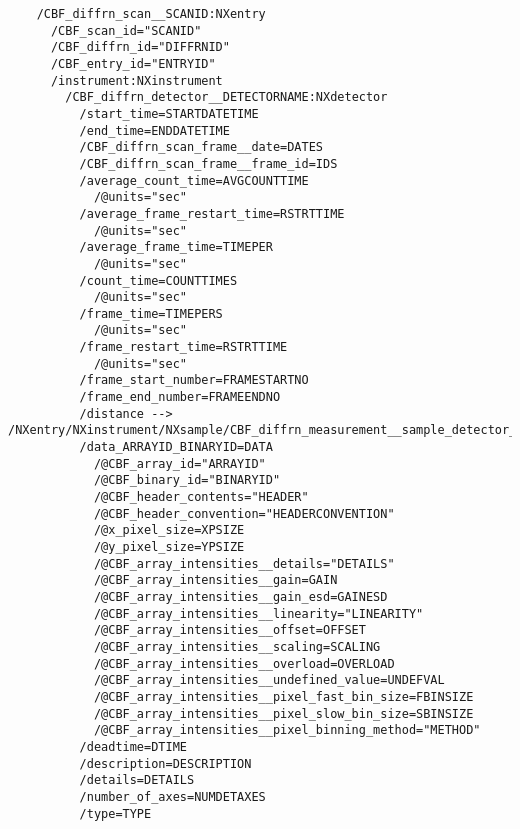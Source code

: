 \documentclass[11pt]{article}
\begin{document}
\footnotesize{\begin{verbatim}
    /CBF_diffrn_scan__SCANID:NXentry
      /CBF_scan_id="SCANID"
      /CBF_diffrn_id="DIFFRNID"
      /CBF_entry_id="ENTRYID"
      /instrument:NXinstrument
        /CBF_diffrn_detector__DETECTORNAME:NXdetector
          /start_time=STARTDATETIME
          /end_time=ENDDATETIME
          /CBF_diffrn_scan_frame__date=DATES
          /CBF_diffrn_scan_frame__frame_id=IDS
          /average_count_time=AVGCOUNTTIME
            /@units="sec"
          /average_frame_restart_time=RSTRTTIME
            /@units="sec" 
          /average_frame_time=TIMEPER
            /@units="sec" 
          /count_time=COUNTTIMES
            /@units="sec"
          /frame_time=TIMEPERS
            /@units="sec" 
          /frame_restart_time=RSTRTTIME
            /@units="sec" 
          /frame_start_number=FRAMESTARTNO
          /frame_end_number=FRAMEENDNO
          /distance --> /NXentry/NXinstrument/NXsample/CBF_diffrn_measurement__sample_detector_distance
          /data_ARRAYID_BINARYID=DATA
            /@CBF_array_id="ARRAYID"
            /@CBF_binary_id="BINARYID"
            /@CBF_header_contents="HEADER"
            /@CBF_header_convention="HEADERCONVENTION"
            /@x_pixel_size=XPSIZE
            /@y_pixel_size=YPSIZE
            /@CBF_array_intensities__details="DETAILS"
            /@CBF_array_intensities__gain=GAIN
            /@CBF_array_intensities__gain_esd=GAINESD
            /@CBF_array_intensities__linearity="LINEARITY"
            /@CBF_array_intensities__offset=OFFSET
            /@CBF_array_intensities__scaling=SCALING
            /@CBF_array_intensities__overload=OVERLOAD
            /@CBF_array_intensities__undefined_value=UNDEFVAL
            /@CBF_array_intensities__pixel_fast_bin_size=FBINSIZE
            /@CBF_array_intensities__pixel_slow_bin_size=SBINSIZE
            /@CBF_array_intensities__pixel_binning_method="METHOD"
          /deadtime=DTIME
          /description=DESCRIPTION
          /details=DETAILS
          /number_of_axes=NUMDETAXES
          /type=TYPE
        

\end{verbatim}}
\end{document}
